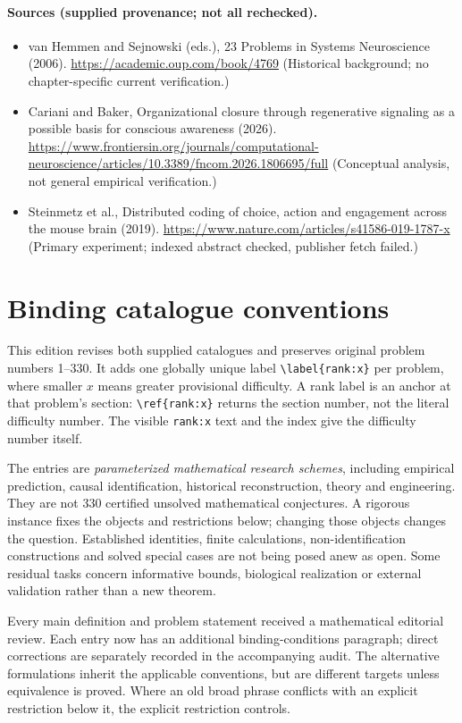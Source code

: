 \documentclass[11pt]{article}
\begin{document}
\paragraph{Sources (supplied provenance; not all rechecked).} \begin{itemize}
\item van Hemmen and Sejnowski (eds.), 23 Problems in Systems Neuroscience (2006). \url{https://academic.oup.com/book/4769} (Historical background; no chapter-specific current verification.)
\item Cariani and Baker, Organizational closure through regenerative signaling as a possible basis for conscious awareness (2026). \url{https://www.frontiersin.org/journals/computational-neuroscience/articles/10.3389/fncom.2026.1806695/full} (Conceptual analysis, not general empirical verification.)
\item Steinmetz et al., Distributed coding of choice, action and engagement across the mouse brain (2019). \url{https://www.nature.com/articles/s41586-019-1787-x} (Primary experiment; indexed abstract checked, publisher fetch failed.)
\end{itemize}


\section*{Binding catalogue conventions}
This edition revises both supplied catalogues and preserves original problem numbers 1--330. It adds one globally unique label \verb|\label{rank:x}| per problem, where smaller $x$ means greater provisional difficulty. A rank label is an anchor at that problem's section: \verb|\ref{rank:x}| returns the section number, not the literal difficulty number. The visible \texttt{rank:x} text and the index give the difficulty number itself.

The entries are \emph{parameterized mathematical research schemes}, including empirical prediction, causal identification, historical reconstruction, theory and engineering. They are not 330 certified unsolved mathematical conjectures. A rigorous instance fixes the objects and restrictions below; changing those objects changes the question. Established identities, finite calculations, non-identification constructions and solved special cases are not being posed anew as open. Some residual tasks concern informative bounds, biological realization or external validation rather than a new theorem.

Every main definition and problem statement received a mathematical editorial review. Each entry now has an additional binding-conditions paragraph; direct corrections are separately recorded in the accompanying audit. The alternative formulations inherit the applicable conventions, but are different targets unless equivalence is proved. Where an old broad phrase conflicts with an explicit restriction below it, the explicit restriction controls.
\end{document}
